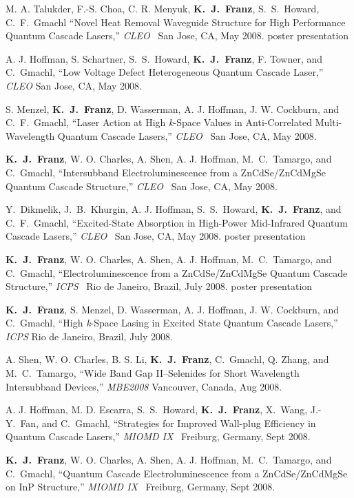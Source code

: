 \begin{list}{}{
  \setlength{\leftmargin}{0.25in}
  \setlength{\rightmargin}{0.25in}
  \setlength{\itemsep}{6pt}
}
\item M. A. Talukder, F.-S. Choa, C. R. Menyuk, \textbf{K.~J.~Franz}, S.~S.~Howard, C.~F.~Gmachl ``Novel Heat Removal Waveguide Structure for High Performance Quantum  Cascade Lasers,'' \emph{CLEO}~ San Jose, CA, May 2008. poster presentation
\item A. J. Hoffman, S. Schartner, S.~S.~Howard, \textbf{K.~J.~Franz}, F. Towner, and C.~Gmachl, ``Low Voltage Defect Heterogeneous Quantum Cascade Laser,'' \emph{CLEO} San Jose, CA, May 2008.
\item S. Menzel, \textbf{K.~J.~Franz}, D. Wasserman, A. J. Hoffman, J. W. Cockburn, and  C.~F.~Gmachl, ``Laser Action at High \emph{k}-Space Values in Anti-Correlated  Multi-Wavelength Quantum Cascade Lasers,'' \emph{CLEO}~ San Jose, CA, May 2008.
\item \textbf{K.~J.~Franz}, W. O. Charles, A. Shen, A. J. Hoffman, M.~C.~Tamargo, and C.~Gmachl, ``Intersubband Electroluminescence from a ZnCdSe/ZnCdMgSe Quantum  Cascade Structure,'' \emph{CLEO}~ San Jose, CA, May 2008.
\item Y.~Dikmelik, J.~B.~Khurgin, A. J. Hoffman, S.~S.~Howard, \textbf{K.~J.~Franz}, and C.~F.~Gmachl, ``Excited-State Absorption in High-Power Mid-Infrared Quantum Cascade Lasers,'' \emph{CLEO}~ San Jose, CA, May 2008. poster presentation
\item \textbf{K.~J.~Franz}, W. O. Charles, A. Shen, A. J. Hoffman, M.~C.~Tamargo, and C.~Gmachl, ``Electroluminescence from a ZnCdSe/ZnCdMgSe Quantum Cascade Structure,'' \emph{ICPS}~ Rio de Janeiro, Brazil, July 2008.  poster presentation
\item \textbf{K.~J.~Franz}, S. Menzel, D. Wasserman, A. J. Hoffman, J. W. Cockburn, and C.~Gmachl, ``High \emph{k}-Space Lasing in Excited State Quantum Cascade Lasers,'' \emph{ICPS}  Rio de Janeiro, Brazil, July 2008.
\item A. Shen, W. O. Charles, B. S. Li, \textbf{K.~J.~Franz}, C.~Gmachl, Q. Zhang, and  M.~C.~Tamargo, ``Wide Band Gap II--Selenides for Short Wavelength Intersubband Devices,'' \emph{MBE2008} Vancouver, Canada, Aug 2008.
\item A. J. Hoffman, M. D. Escarra, S.~S.~Howard, \textbf{K.~J.~Franz}, X.~Wang, \mbox{J.-Y.~Fan}, and C.~Gmachl, ``Strategies for Improved Wall-plug Efficiency in Quantum Cascade Lasers,'' \emph{MIOMD IX}~ Freiburg, Germany, Sept 2008.
\item \textbf{K.~J.~Franz}, W. O. Charles, A. Shen, A. J. Hoffman, M.~C.~Tamargo, and C.~Gmachl, ``Quantum Cascade Electroluminescence from a ZnCdSe/ZnCdMgSe on InP  Structure,'' \emph{MIOMD IX}~ Freiburg, Germany, Sept 2008.

\end{list}
